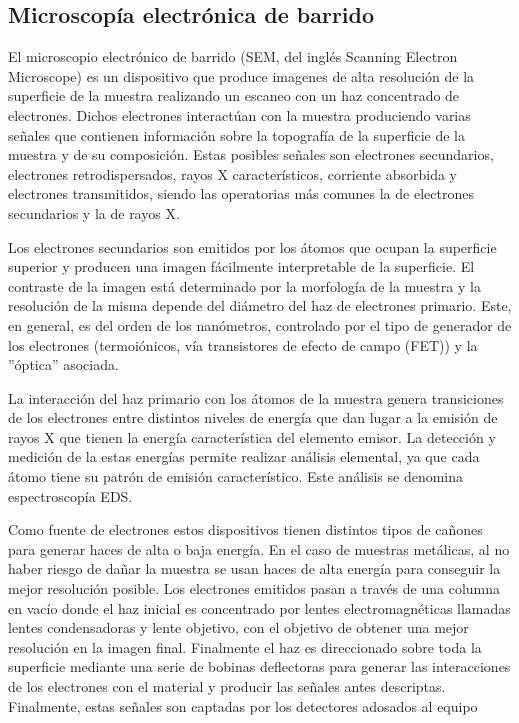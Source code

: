 \documentclass{article}
\theoremstyle{definition}
\theoremstyle{remark}
\begin{document}
\subsection{Microscopía electrónica de barrido}
El microscopio electrónico de barrido (SEM, del inglés Scanning Electron Microscope) es un dispositivo que produce imagenes de alta resolución de la superficie de la muestra realizando un escaneo con un haz concentrado de electrones. Dichos electrones interactúan con la muestra produciendo varias señales que contienen información sobre la topografía de la superficie de la muestra y de su composición. Estas posibles señales son electrones secundarios, electrones retrodispersados, rayos X característicos, corriente absorbida y electrones transmitidos, siendo las operatorias más comunes la de electrones secundarios y la de rayos X.

Los electrones secundarios son emitidos por los átomos que ocupan la superficie superior y producen una imagen fácilmente interpretable de la superficie. El contraste de la imagen está determinado por la morfología de la muestra y la resolución de la misma depende del diámetro del haz de electrones primario. Este, en general, es del orden de los nanómetros, controlado por el tipo de generador de los electrones (termoiónicos, vía transistores de efecto de campo (FET)) y la ''óptica” asociada.

La interacción del haz primario con los átomos de la muestra genera transiciones de los electrones entre distintos niveles de energía que dan lugar a la emisión de rayos X que tienen la energía característica del elemento emisor. La detección y medición de la estas energías permite realizar análisis elemental, ya que cada átomo tiene su patrón de emisión característico. Este análisis se denomina espectroscopía EDS.

Como fuente de electrones estos dispositivos tienen distintos tipos de cañones para generar haces de alta o baja energía. En el caso de muestras metálicas, al no haber riesgo de dañar la muestra se usan haces de alta energía para conseguir la mejor resolución posible. Los electrones emitidos pasan a través de una columna en vacío donde el haz inicial es concentrado por lentes electromagnéticas llamadas lentes condensadoras y lente objetivo, con el objetivo de obtener una mejor resolución en la imagen final. Finalmente el haz es direccionado sobre toda la superficie mediante una serie de bobinas deflectoras para generar las interacciones de los electrones con el material y producir las señales antes descriptas. Finalmente, estas señales son captadas por los detectores adosados al equipo
\end{document}
